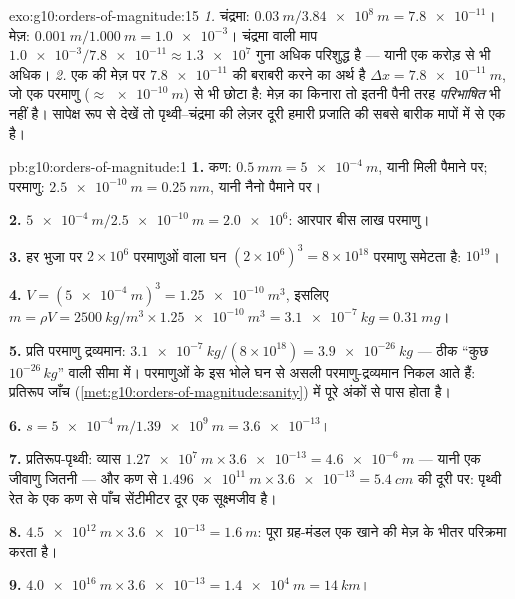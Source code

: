 \begin{solution}{exo:g10:orders-of-magnitude:15}
\emph{1.} चंद्रमा: $\qty{0.03}{m}/\qty{3.84e8}{m} = \num{7.8e-11}$। मेज़: $\qty{0.001}{m}/\qty{1.000}{m} = \num{1.0e-3}$। चंद्रमा वाली माप $\num{1.0e-3}/\num{7.8e-11} \approx \num{1.3e7}$
गुना अधिक परिशुद्ध है --- यानी एक करोड़ से भी अधिक।
\emph{2.} एक  की मेज़ पर $\num{7.8e-11}$ की बराबरी करने का अर्थ है
$\Delta x = \qty{7.8e-11}{m}$, जो एक परमाणु ($\approx \qty{e-10}{m}$) से भी छोटा है: मेज़ का किनारा तो इतनी
पैनी तरह \emph{परिभाषित} भी नहीं है। सापेक्ष रूप से देखें तो
पृथ्वी--चंद्रमा की लेज़र दूरी हमारी प्रजाति की सबसे बारीक मापों में से
एक है।
\end{solution}

\begin{solution}{pb:g10:orders-of-magnitude:1}
\textbf{1.} कण: $\qty{0.5}{mm} = \qty{5e-4}{m}$, यानी मिली पैमाने पर; परमाणु: $\qty{2.5e-10}{m} = \qty{0.25}{nm}$, यानी
नैनो पैमाने पर।

\textbf{2.} $\qty{5e-4}{m}/\qty{2.5e-10}{m} = \num{2.0e6}$: आरपार बीस लाख परमाणु।

\textbf{3.} हर भुजा पर $2 \times 10^{6}$ परमाणुओं वाला घन $(2\times10^{6})^{3} = 8 \times 10^{18}$ परमाणु समेटता
है:  $10^{19}$।

\textbf{4.} $V = (\qty{5e-4}{m})^{3} = \qty{1.25e-10}{m^3}$, इसलिए $m = \rho V = \qty{2500}{kg/m^3} \times \qty{1.25e-10}{m^3}
= \qty{3.1e-7}{kg} = \qty{0.31}{mg}$।

\textbf{5.} प्रति परमाणु द्रव्यमान: $\qty{3.1e-7}{kg}/(8\times10^{18}) = \qty{3.9e-26}{kg}$ --- ठीक ``कुछ $10^{-26}\,\unit{kg}$''
वाली सीमा में। परमाणुओं के इस भोले घन से असली परमाणु-द्रव्यमान निकल आते
हैं: प्रतिरूप जाँच (\cref{met:g10:orders-of-magnitude:sanity}) में पूरे अंकों से पास होता है।

\textbf{6.} $s = \qty{5e-4}{m}/\qty{1.39e9}{m} = \num{3.6e-13}$।

\textbf{7.} प्रतिरूप-पृथ्वी: व्यास $\qty{1.27e7}{m} \times \num{3.6e-13} = \qty{4.6e-6}{m}$ --- यानी एक जीवाणु जितनी ---
और कण से $\qty{1.496e11}{m} \times \num{3.6e-13} = \qty{5.4}{cm}$ की दूरी पर: पृथ्वी रेत के एक कण से पाँच सेंटीमीटर दूर
एक सूक्ष्मजीव है।

\textbf{8.} $\qty{4.5e12}{m} \times \num{3.6e-13} = \qty{1.6}{m}$: पूरा ग्रह-मंडल एक खाने की मेज़ के भीतर परिक्रमा
करता है।

\textbf{9.} $\qty{4.0e16}{m} \times \num{3.6e-13} = \qty{1.4e4}{m}
= \qty{14}{km}$।


\end{solution}
